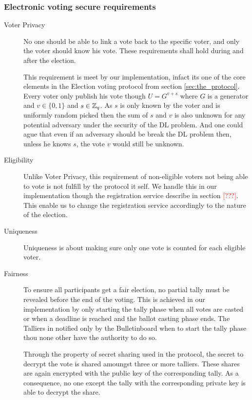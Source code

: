 \subsubsection{Electronic voting secure requirements}

\begin{description}
    \item[Voter Privacy]
        No one should be able to link a vote back to the specific voter, and only the voter should
        know his vote. These requirements shall hold during and after the election.  
        
        This requirement is meet by our implementation, infact its one of the core elements in the
        Election voting protocol from section \ref{sec:the_protocol}. Every voter only publish his vote
        though $U = G^{v+s}$ where $G$ is a generator and $v \in \{0,1\}$ and $s \in \mathbb{Z}_q$. As $s$ is only
        known by the voter and is uniformly random picked then the sum of $s$ and $v$ is also unknown for any 
        potential adversary under the security of the DL problem. And one could ague that even if an
        adversary should be break the DL problem then, unless he knows $s$, the vote $v$ would still
        be unknown. 
        
        
    \item[Eligibility]
        Unlike Voter Privacy, this requirement of non-eligible voters not being able to vote is not
        fulfill by the protocol it self. We handle this in our implementation though the registration service
        describe in section \textcolor{red}{[???]}. This enable us to change the registration service 
        accordingly to the nature of the election.         
        
        
    \item[Uniqueness]
        Uniqueness is about making sure only one vote is counted for each eligible
        voter. 
        
    \item[Fairness]
        To ensure all participants get a fair election, no partial tally must be
        revealed before the end of the voting. This is achieved in our implementation
        by only starting the tally phase when all votes are casted or when a deadline is 
        reached and the ballot casting phase ends. The Talliers in notified only by the Bulletinboard
        when to start the tally phase thou none other have the authority to do so.  
        
        Through the property of secret sharing used in the protocol, the secret to decrypt the
        vote is shared amoungst three or more talliers. These shares are again encrypted with the public key 
        of the corresponding tally. As a consequence, no one except the tally with the corresponding
        private key is able to decrypt the share.
        

\end{description}

